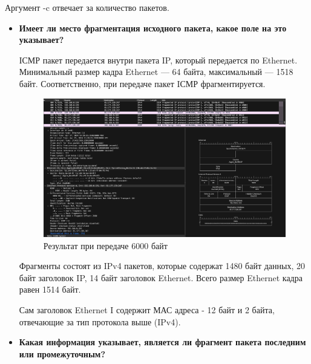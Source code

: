 \documentclass[12pt,onecolumn]{article}
\begin{document}
Аргумент -c отвечает за количество пакетов.
\begin{itemize}
    \item {
\textbf{Имеет ли место фрагментация исходного пакета, какое поле на это указывает?}

ІСМР пакет передается внутри пакета IP, который передается по Ethernet. 
Минимальный размер кадра Ethernet — 64 байта, максимальный — 1518 байт. 
Соответственно, при передаче пакет IСМР фрагментируется.
\begin{figure}[H]
    \centering
    \includegraphics*[width=\textwidth]{image/part1/ping6000.png}
    \caption{Результат при передаче 6000 байт}
\end{figure}
Фрагменты состоят из IPv4 пакетов, которые содержат 1480 байт данных, 20 байт заголовок IP, 14 байт заголовок Ethernet. Всего размер Ethernet кадра равен 1514 байт.

Сам заголовок Ethernet I содержит МАС адреса - 12 байт и 2 байта,
отвечающие за тип протокола выше (IPv4).
    }
    \item {
        \textbf{Какая информация указывает, является ли фрагмент пакета последним или промежуточным?}
        
}
\end{itemize}
\end{document}
